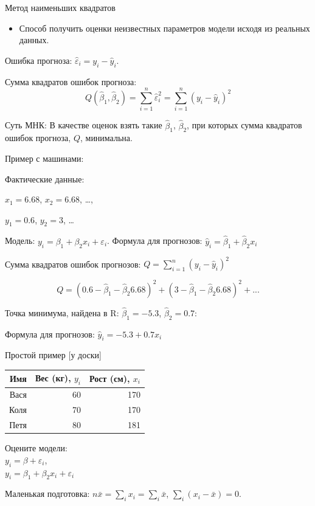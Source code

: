 \documentclass[ignorenonframetext,]{beamer}
\begin{document}
\begin{frame}{Метод наименьших квадратов}

\begin{itemize}
\itemsep1pt\parskip0pt
\item
  Способ получить оценки неизвестных параметров модели исходя из
  реальных данных.
\end{itemize}

Ошибка прогноза: \(\hat{\varepsilon}_i=y_i-\hat{y}_i\).

Сумма квадратов ошибок прогноза: \[
Q(\hat{\beta}_1,\hat{\beta}_2)=\sum_{i=1}^n \hat{\varepsilon}_i^2=\sum_{i=1}^n (y_i-\hat{y}_i)^2
\]

Суть МНК: В качестве оценок взять такие \(\hat{\beta}_1\),
\(\hat{\beta}_2\), при которых сумма квадратов ошибок прогноза, \(Q\),
минимальна.

\end{frame}

\begin{frame}{Пример с машинами:}

Фактические данные:

\(x_1=6.68\), \(x_2=6.68\), \ldots{},

\(y_1=0.6\), \(y_2=3\), \ldots{}

Модель: \(y_i=\beta_1+\beta_2 x_i+\varepsilon_i\). Формула для
прогнозов: \(\hat{y}_i=\hat{\beta}_1 + \hat{\beta}_2 x_i\)

Сумма квадратов ошибок прогнозов: \(Q=\sum_{i=1}^n (y_i-\hat{y}_i)^2\)

\[
Q=(0.6-\hat{\beta}_1-\hat{\beta}_2 6.68)^2+(3-\hat{\beta}_1-\hat{\beta}_2 6.68)^2+...
\]

Точка минимума, найдена в R: \(\hat{\beta}_1=-5.3\),
\(\hat{\beta}_2=0.7\):

Формула для прогнозов: \(\hat{y}_i=-5.3 + 0.7 x_i\)

\end{frame}

\begin{frame}{Простой пример {[}у доски{]}}

\begin{longtable}[c]{@{}rrr@{}}
\toprule
Имя & Вес (кг), \(y_i\) & Рост (см), \(x_i\)\tabularnewline
\midrule
\endhead
Вася & 60 & 170\tabularnewline
Коля & 70 & 170\tabularnewline
Петя & 80 & 181\tabularnewline
\bottomrule
\end{longtable}

Оцените
модели:\\\(y_i=\beta +\varepsilon_i\),\\\(y_i=\beta_1+\beta_2 x_i +\varepsilon_i\)

Маленькая подготовка: \(n\bar{x}=\sum_i x_i=\sum_i \bar{x}\),
\(\sum_i (x_i - \bar{x})=0\).

\end{frame}
\end{document}
